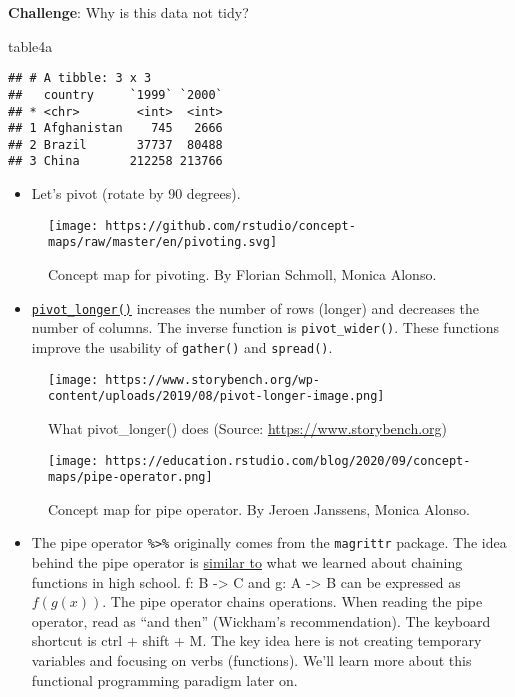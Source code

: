 \documentclass[
]{book}
\newenvironment{Shaded}{\begin{snugshade}}{\end{snugshade}}
\newcommand{\NormalTok}[1]{#1}
\providecommand{\tightlist}{%
  \setlength{\itemsep}{0pt}\setlength{\parskip}{0pt}}
\begin{document}
\textbf{Challenge}: Why is this data not tidy?

\begin{Shaded}
\begin{Highlighting}[]
\NormalTok{table4a}
\end{Highlighting}
\end{Shaded}

\begin{verbatim}
## # A tibble: 3 x 3
##   country     `1999` `2000`
## * <chr>        <int>  <int>
## 1 Afghanistan    745   2666
## 2 Brazil       37737  80488
## 3 China       212258 213766
\end{verbatim}

\begin{itemize}
\tightlist
\item
  Let's pivot (rotate by 90 degrees).
\end{itemize}

\begin{figure}
\centering
\texttt{[image: https://github.com/rstudio/concept-maps/raw/master/en/pivoting.svg]}
\caption{Concept map for pivoting. By Florian Schmoll, Monica Alonso.}
\end{figure}

\begin{itemize}
\tightlist
\item
  \href{https://tidyr.tidyverse.org/reference/pivot_longer.html}{\texttt{pivot\_longer()}} increases the number of rows (longer) and decreases the number of columns. The inverse function is \texttt{pivot\_wider()}. These functions improve the usability of \texttt{gather()} and \texttt{spread()}.
\end{itemize}

\begin{figure}
\centering
\texttt{[image: https://www.storybench.org/wp-content/uploads/2019/08/pivot-longer-image.png]}
\caption{What pivot\_longer() does (Source: \url{https://www.storybench.org})}
\end{figure}

\begin{figure}
\centering
\texttt{[image: https://education.rstudio.com/blog/2020/09/concept-maps/pipe-operator.png]}
\caption{Concept map for pipe operator. By Jeroen Janssens, Monica Alonso.}
\end{figure}

\begin{itemize}
\tightlist
\item
  The pipe operator \texttt{\%\textgreater{}\%} originally comes from the \texttt{magrittr} package. The idea behind the pipe operator is \href{https://www.datacamp.com/community/tutorials/pipe-r-tutorial}{similar to} what we learned about chaining functions in high school. f: B -\textgreater{} C and g: A -\textgreater{} B can be expressed as \(f(g(x))\). The pipe operator chains operations. When reading the pipe operator, read as ``and then'' (Wickham's recommendation). The keyboard shortcut is ctrl + shift + M. The key idea here is not creating temporary variables and focusing on verbs (functions). We'll learn more about this functional programming paradigm later on.
\end{itemize}
\end{document}
